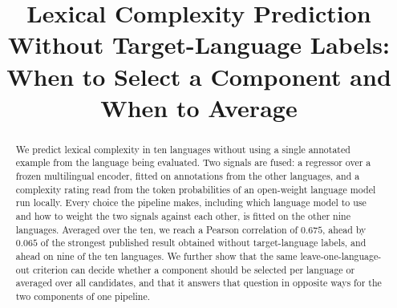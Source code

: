 \renewcommand{\topfraction}{0.9}
\renewcommand{\bottomfraction}{0.5}
\renewcommand{\textfraction}{0.08}
\renewcommand{\floatpagefraction}{0.8}

%
%

\title{Lexical Complexity Prediction Without Target-Language Labels:\\
       When to Select a Component and When to Average}

%
\author{}


\maketitle

\begin{abstract}
We predict lexical complexity in ten languages without using a single
annotated example from the language being evaluated. Two signals are
fused: a regressor over a frozen multilingual encoder, fitted on
annotations from the other languages, and a complexity rating read from
the token probabilities of an open-weight language model run locally.
Every choice the pipeline makes, including which language model to use
and how to weight the two signals against each other, is fitted on the
other nine languages. Averaged over the ten, we reach a Pearson
correlation of $0.675$, ahead by $0.065$ of the strongest published
result obtained without target-language labels, and ahead on nine of the
ten languages. We further show that the same leave-one-language-out
criterion can decide whether a component should be selected per language
or averaged over all candidates, and that it answers that question in
opposite ways for the two components of one pipeline.
\end{abstract}


